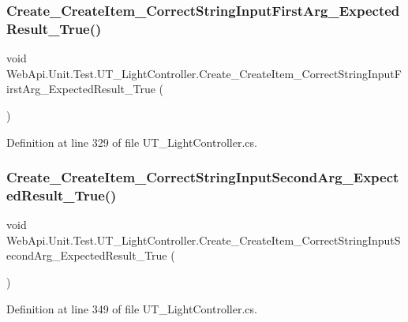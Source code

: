 \subsubsection{\texorpdfstring{Create\+\_\+\+Create\+Item\+\_\+\+Correct\+String\+Input\+First\+Arg\+\_\+\+Expected\+Result\+\_\+\+True()}{Create\_CreateItem\_CorrectStringInputFirstArg\_ExpectedResult\_True()}}
{\footnotesize\ttfamily void Web\+Api.\+Unit.\+Test.\+U\+T\+\_\+\+Light\+Controller.\+Create\+\_\+\+Create\+Item\+\_\+\+Correct\+String\+Input\+First\+Arg\+\_\+\+Expected\+Result\+\_\+\+True (\begin{DoxyParamCaption}{ }\end{DoxyParamCaption})}



Definition at line 329 of file U\+T\+\_\+\+Light\+Controller.\+cs.

\mbox{\label{class_web_api_1_1_unit_1_1_test_1_1_u_t___light_controller_aa31408d9b9a852e0942e68219c623961}} 
\subsubsection{\texorpdfstring{Create\+\_\+\+Create\+Item\+\_\+\+Correct\+String\+Input\+Second\+Arg\+\_\+\+Expected\+Result\+\_\+\+True()}{Create\_CreateItem\_CorrectStringInputSecondArg\_ExpectedResult\_True()}}
{\footnotesize\ttfamily void Web\+Api.\+Unit.\+Test.\+U\+T\+\_\+\+Light\+Controller.\+Create\+\_\+\+Create\+Item\+\_\+\+Correct\+String\+Input\+Second\+Arg\+\_\+\+Expected\+Result\+\_\+\+True (\begin{DoxyParamCaption}{ }\end{DoxyParamCaption})}



Definition at line 349 of file U\+T\+\_\+\+Light\+Controller.\+cs.

